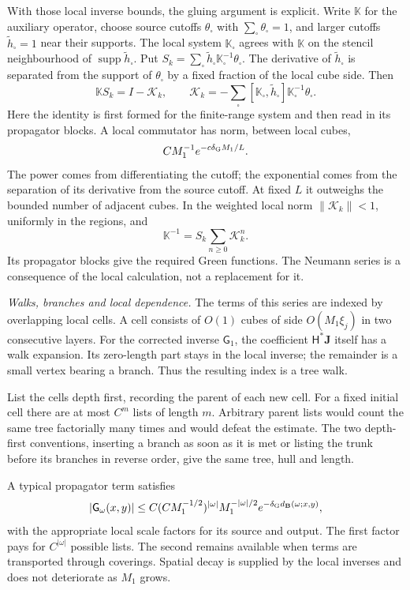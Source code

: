 \documentclass[11pt,letterpaper,reqno]{amsart}
\theoremstyle{definition}
\theoremstyle{remark}
\begin{document}
With those local inverse bounds, the gluing argument is
explicit. Write $\mathbb K$ for the auxiliary operator,
choose source cutoffs $\theta_\square$ with
$\sum_\square\theta_\square=1$, and larger cutoffs
$\widetilde h_\square=1$ near their supports.
The local system $\mathbb K_\square$ agrees with
$\mathbb K$ on the stencil neighbourhood of
$\operatorname{supp}\widetilde h_\square$. Put
$S_k=\sum_\square\widetilde h_\square
                  \mathbb K_\square^{-1}\theta_\square$.
The derivative of $\widetilde h_\square$ is separated
from the support of $\theta_\square$ by a fixed
fraction of the local cube side. Then
\begin{equation}\label{eq:xrg-parametrix}
 \mathbb KS_k=I-\mathcal K_k,\qquad
 \mathcal K_k=-\sum_\square
 [\mathbb K_\square,\widetilde h_\square]
                      \mathbb K_\square^{-1}\theta_\square.
\end{equation}
Here the identity is first formed for the finite-range
system and then read in its propagator blocks. A local
commutator has norm, between local cubes,
\[
 CM_1^{-1}e^{-c\delta_{\rm G}M_1/L}.
\]
The power comes from differentiating the cutoff; the
exponential comes from the separation of its derivative
from the source cutoff. At fixed $L$ it outweighs the
bounded number of adjacent cubes. In the weighted
local norm $\|\mathcal K_k\|<1$, uniformly in the
regions, and
\[
 \mathbb K^{-1}=S_k\sum_{n\ge0}\mathcal K_k^n.
\]
Its propagator blocks give the required Green
functions. The Neumann series is a consequence of
the local calculation, not a replacement for it.

\emph{Walks, branches and local dependence.}
The terms of this series are indexed by overlapping
local cells. A cell consists of $O(1)$ cubes of side
$O(M_1\xi_j)$ in two consecutive layers. For the
corrected inverse $\mathsf G_1$, the coefficient
$\mathsf H^*\mathbf J$ itself has a walk expansion.
Its zero-length part stays in the local inverse; the
remainder is a small vertex bearing a branch. Thus
the resulting index is a tree walk.

List the cells depth first, recording the parent of
each new cell. For a fixed initial cell there are
at most $C^m$ lists of length $m$. Arbitrary parent
lists would count the same tree factorially many
times and would defeat the estimate. The two
depth-first conventions, inserting a branch as
soon as it is met or listing the trunk before
its branches in reverse order, give the same
tree, hull and length.

A typical propagator term satisfies
\begin{equation}\label{eq:rg-walks}
 |\mathsf G_\omega(x,y)|
 \le C(CM_1^{-1/2})^{|\omega|}M_1^{-|\omega|/2}
                   e^{-\delta_{\rm G}d_{\mathbf B}(\omega;x,y)},
\end{equation}
with the appropriate local scale factors for its
source and output. The first factor pays for
$C^{|\omega|}$ possible lists. The second remains
available when terms are transported through
coverings. Spatial decay is supplied by the local
inverses and does not deteriorate as $M_1$ grows.
\end{document}
